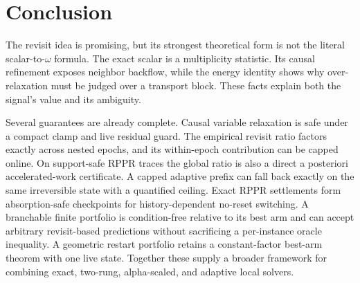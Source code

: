 \section{Conclusion}

The revisit idea is promising, but its strongest theoretical form is not the
literal scalar-to-$\omega$ formula.  The exact scalar is a multiplicity
statistic.  Its causal refinement exposes neighbor backflow, while the energy
identity shows why over-relaxation must be judged over a transport block.
These facts explain both the signal's value and its ambiguity.

Several guarantees are already complete.  Causal variable relaxation is safe
under a compact clamp and live residual guard.  The empirical revisit ratio
factors exactly across nested epochs, and its within-epoch contribution can
be capped online.  On support-safe RPPR traces the global ratio is also a
direct a posteriori accelerated-work certificate.  A capped adaptive prefix
can fall back exactly on the same irreversible state with a quantified
ceiling.  Exact RPPR settlements form absorption-safe checkpoints for
history-dependent no-reset switching.  A
branchable finite portfolio is condition-free relative to its best arm and
can accept arbitrary
revisit-based predictions without sacrificing a per-instance oracle
inequality.  A geometric restart portfolio retains a constant-factor
best-arm theorem with one live state.  Together these supply a broader
framework for combining exact, two-rung, alpha-scaled, and adaptive local
solvers.


